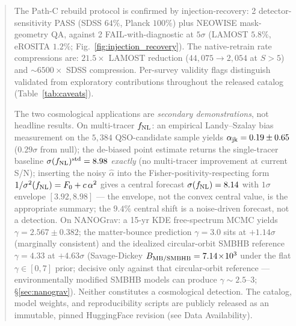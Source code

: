 \documentclass[aps,prd,twocolumn,superscriptaddress,showpacs,preprintnumbers,nofootinbib,longbibliography,floatfix]{revtex4-2}
\newcommand{\sigfnl}{\sigma(f_{\rm NL})}
\begin{document}
\begin{abstract}
The Path-C rebuild protocol is confirmed by injection-recovery: 2 detector-sensitivity PASS (SDSS $64\%$, Planck $100\%$) plus NEOWISE mask-geometry QA, against 2 FAIL-with-diagnostic at $5\sigma$ (LAMOST $5.8\%$, eROSITA $1.2\%$; Fig.~\ref{fig:injection_recovery}). The native-retrain rate compressions are: $21.5\times$ LAMOST reduction ($44{,}075 \to 2{,}054$ at $S>5$) and $\sim\!6500\times$ SDSS compression. Per-survey validity flags distinguish validated from exploratory contributions throughout the released catalog (Table~\ref{tab:caveats}).

The two cosmological applications are \emph{secondary demonstrations}, not headline results. On multi-tracer $f_{\rm NL}$: an empirical Landy--Szalay bias measurement on the $5{,}384$ QSO-candidate sample yields $\alpha_{\rm jk} = 0.19 \pm 0.65$ ($0.29\sigma$ from null); the de-biased point estimate returns the single-tracer baseline $\sigfnl^{\rm std} = 8.98$ \emph{exactly} (no multi-tracer improvement at current S/N); inserting the noisy $\hat\alpha$ into the Fisher-positivity-respecting form $1/\sigma^2(f_{\rm NL}) = F_0 + c\,\alpha^2$ gives a central forecast $\sigfnl = 8.14$ with $1\sigma$ envelope $[3.92, 8.98]$ --- the envelope, not the convex central value, is the appropriate summary; the $9.4\%$ central shift is a noise-driven forecast, not a detection. On NANOGrav: a 15-yr KDE free-spectrum MCMC yields $\gamma = 2.567 \pm 0.382$; the matter-bounce prediction $\gamma = 3.0$ sits at $+1.14\sigma$ (marginally consistent) and the idealized circular-orbit SMBHB reference $\gamma = 4.33$ at $+4.63\sigma$ (Savage-Dickey $B_{\rm MB/SMBHB} = 7.14\!\times\!10^3$ under the flat $\gamma\in[0,7]$ prior; decisive only against that circular-orbit reference --- environmentally modified SMBHB models can produce $\gamma \sim 2.5$--$3$; \S\ref{sec:nanograv}). Neither constitutes a cosmological detection. The catalog, model weights, and reproducibility scripts are publicly released as an immutable, pinned HuggingFace revision (see Data Availability).
\end{abstract}


\maketitle


\end{document}
